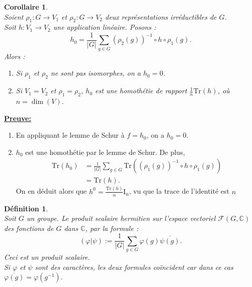 \documentclass[a4paper, 14pt]{report}
\newtheorem{definition}{Définition}[section]
\newtheorem{corollary}{Corollaire}[section]
\begin{document}
\begin{onehalfspace}
{\begin{enumerate} [label=\roman*)]
			\end{enumerate}
			
			
			\begin{corollary} \cite{serre1971representation} \label{cor1}\\
Soient \( \rho_1 : G \rightarrow V_1 \) et \( \rho_2 : G \rightarrow V_2 \) deux représentations irréductibles de \( G \). \\
				Soit \( h  : V_1 \to V_2 \) une application linéaire. Posons :
				\[
				h_0 = \frac{1}{|G|} \sum_{g \in G} (\rho_2(g))^{-1} \circ h \circ \rho_1(g).
				\]
				Alors :
				\begin{enumerate}[label=\roman*)]
					\item Si \( \rho_1 \) et \( \rho_2 \) ne sont pas isomorphes, on a \( h_0 = 0 \).
					\item Si \( V_1 = V_2 \) et \( \rho_1 = \rho_2 \), \( h_0 \) est une homothétie de rapport \( \frac{1}{n} \text{Tr}(h)  \), où \( n = \dim(V) \).
				\end{enumerate}
			\end{corollary}
			
			
			\textbf{\underline{Preuve:}}
			\begin{enumerate}[label=\roman*)]
				\item En appliquant le lemme de Schur à \( f = h_0 \), on a \( h_0 = 0 \).
				\item \( h_0 \) est une homothétie par le lemme de Schur. De plus, \[
				\begin{aligned}
					\text{Tr}(h_0) &= \frac{1}{|G|} \sum_{g \in G} \text{Tr}((\rho_1(g))^{-1} \circ h \circ \rho_1(g)) \\
					&= \text{Tr}(h).
				\end{aligned}
				\]
On en déduit alors que \( h^0 = \frac{\text{Tr}(h)}{n} \mathrm{I_n} \), vu que la trace de l’identité est \( n \)
			\end{enumerate}
	
			
			\begin{definition} \cite{serre1971representation}\\
Soit $G$ un groupe. Le produit scalaire hermitien sur l’espace vectoriel $\mathscr{F}(G, \mathbb{C})$ des fonctions de $G$ dans $\mathbb{C}$, par la formule :
				\[
				(\varphi | \psi) := \frac{1}{|G|} \sum_{g \in G} \varphi(g) \overline{\psi(g)}.
				\]
Ceci est un produit scalaire.\\
Si $\varphi$ et $\psi$ sont des caractères, les deux formules coïncident car dans ce cas $\overline{\varphi(g)} = \varphi(g^{-1})$.
			\end{definition}

}
\end{onehalfspace}
\end{document}
